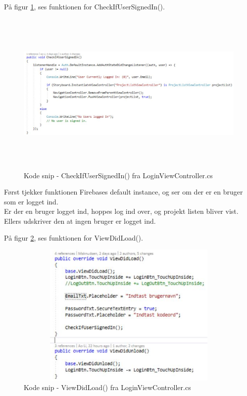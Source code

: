 På figur \ref{fig:Checkifusersigned}, ses funktionen for CheckIfUserSignedIn().
\begin{figure}[H] %
	\centering
	\includegraphics[height=8cm, width=15cm]{../ArkitekturDesign/Design/Login/Checkifusersigned}
	\caption{Kode snip - CheckIfUserSignedIn() fra LoginViewController.cs}
	\label{fig:Checkifusersigned}
\end{figure}
Først tjekker funktionen Firebases default instance, og ser om der er en bruger som er logget ind. \\
Er der en bruger logget ind, hoppes log ind over, og projekt listen bliver vist. \\
Ellers udskriver den at ingen bruger er logget ind.

På figur \ref{fig:ViewDidLoadLogin}, ses funktionen for ViewDidLoad().
\begin{figure}[H] %
	\centering
	\includegraphics[height=7cm, width=12cm]{../ArkitekturDesign/Design/Login/ViewDidLoad}
	\caption{Kode snip - ViewDidLoad() fra LoginViewController.cs}
	\label{fig:ViewDidLoadLogin}
\end{figure}


